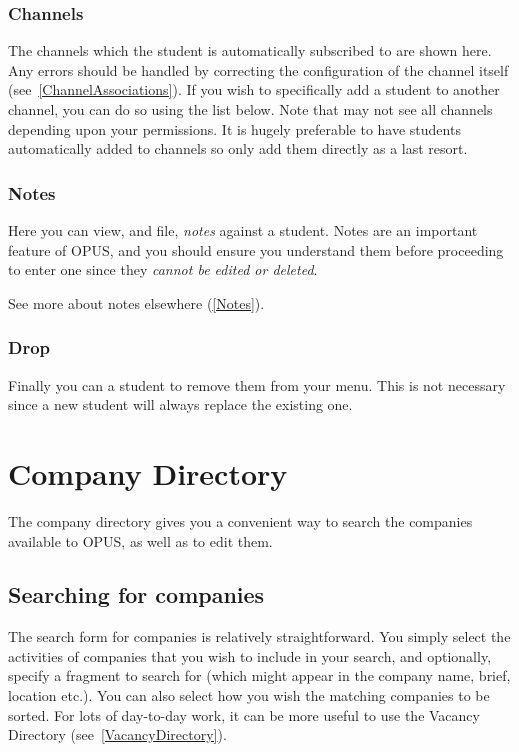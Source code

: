 \documentclass[12 pt]{book}
\begin{document}
\subsection{Channels}

The channels which the student is automatically subscribed to are shown here.
Any errors should be handled by correcting the configuration of the channel
itself (see~\ref{ChannelAssociations}). If you wish to specifically add a student to another
channel, you can do so using the list below. Note that may not see all channels
depending upon your permissions. It is hugely preferable to have students
automatically added to channels so only add them directly as a last resort.

\subsection{Notes}

Here you can view, and file, \emph{notes} against a student. Notes are an
important feature of OPUS, and you should ensure you understand them before
proceeding to enter one since they \emph{cannot be edited or deleted}.

See more about notes elsewhere (\ref{Notes}).

\subsection{Drop}

Finally you can  a student to remove them from your menu. This is
not necessary since a new student will always replace the existing one.

%
%
%

\chapter{Company Directory}
\label{CompanyDirectory}

The company directory gives you a convenient way to search the companies
available to OPUS, as well as to edit them.

\section{Searching for companies}

The search form for companies is relatively straightforward. You simply select
the activities of companies that you wish to include in your search, and
optionally, specify a fragment to search for (which might appear in the
company name, brief, location etc.). You can also select how you wish the
matching companies to be sorted. For lots of day-to-day work, it can be
more useful to use the Vacancy Directory (see~\ref{VacancyDirectory}).
\end{document}
